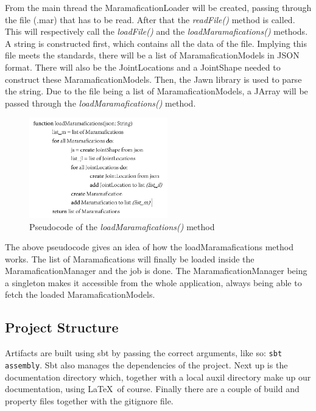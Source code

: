 \documentclass[10pt]{extarticle} %
\begin{document}
    From the main thread the MaramaficationLoader will be created, passing through the file (.mar) that has to be read.
    After that the \textit{readFile()} method is called.
    This will respectively call the \textit{loadFile()} and the \textit{loadMaramafications()} methods.
    A string is constructed first, which contains all the data of the file.
    Implying this file meets the standards, there will be a list of MaramaficationModels in JSON format.
    There will also be the JointLocations and a JointShape needed to construct these MaramaficationModels.
    Then, the Jawn library is used to parse the string. Due to the file being a list of MaramaficationModels, a JArray will be passed through the \textit{loadMaramafications()} method.
    \newpage
    \begin{figure}[htb]
        \center
        \includegraphics[width=60mm, keepaspectratio]{pseudocode}
        \caption{Pseudocode of the \textit{loadMaramafications()} method}
    \end{figure}

    The above pseudocode gives an idea of how the loadMaramafications method works.
    The list of Maramafications will finally be loaded inside the MaramaficationManager and the job is done.
    The MaramaficationManager being a singleton makes it accessible from the whole application, always being able to fetch the loaded MaramaficationModels.

    \subsection{Project Structure}
    Artifacts are built using sbt by passing the correct arguments, like so: \texttt{sbt assembly}.
    Sbt also manages the dependencies of the project.
    Next up is the documentation directory which, together with a local auxil directory make up our documentation, using \LaTeX\ of course.
    Finally there are a couple of build and property files together with the gitignore file.

    \newpage
\end{document}
